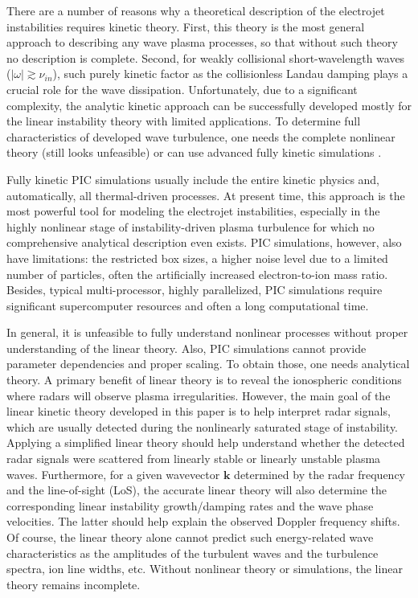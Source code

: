 \documentclass[draft]{agujournal2019}
\renewcommand{\vec}{\mathbf}
\begin{document}
There are a number of reasons why a theoretical description of the electrojet
instabilities requires kinetic theory. First, this theory is the most
general approach to describing any wave plasma processes, so that without such
theory no description is complete. Second, for weakly collisional
short-wavelength waves ($|\omega|\gtrsim\nu_{in}$), such purely kinetic factor
as the collisionless Landau damping plays a crucial role for the wave
dissipation. Unfortunately, due to a significant complexity, the analytic kinetic approach can be successfully developed 
mostly for the linear instability theory with limited applications. To
determine full characteristics of developed wave turbulence, one needs the
complete nonlinear theory (still looks unfeasible) or can use advanced fully
kinetic simulations
\cite{Oppenheim:Ion_thermal04,Oppenheim:Large08,Oppenheim:Kinetic13,Oppenheim:Newly20}.

Fully kinetic PIC simulations usually include the entire kinetic physics and,
automatically, all thermal-driven processes. At present time, this approach is
the most powerful tool for modeling the electrojet instabilities, especially
in the highly nonlinear stage of instability-driven plasma turbulence for
which no comprehensive analytical description even exists. PIC simulations,
however, also have limitations: the restricted box sizes, a higher noise
level due to a limited number of particles, often the artificially increased
electron-to-ion mass ratio. Besides, typical multi-processor, highly
parallelized, PIC simulations require significant supercomputer resources and
often a long computational time.

In general, it is unfeasible to fully understand nonlinear processes without proper
understanding of the linear theory. Also, PIC simulations cannot provide
parameter dependencies and proper scaling. To obtain those, one needs
analytical theory. A primary benefit of linear theory is to reveal the ionospheric 
conditions where radars will observe plasma irregularities. However, 
the main goal of the linear kinetic theory developed in
this paper is to help interpret radar signals, which are usually
detected during the nonlinearly saturated stage of instability. 
Applying a simplified linear theory should help understand whether the
detected radar signals were scattered from linearly stable or linearly
unstable plasma waves. 
Furthermore, for a given wavevector $\vec{k}$
determined by the radar frequency and the line-of-sight (LoS), the accurate
linear theory will also determine the corresponding linear instability
growth/damping rates and the wave phase velocities. The latter should help
explain the observed Doppler frequency shifts. Of course, the linear theory alone
cannot predict such energy-related wave characteristics as the amplitudes of
the turbulent waves and the turbulence spectra, ion line widths, etc.
Without nonlinear theory or simulations, the linear theory remains incomplete.
\end{document}
